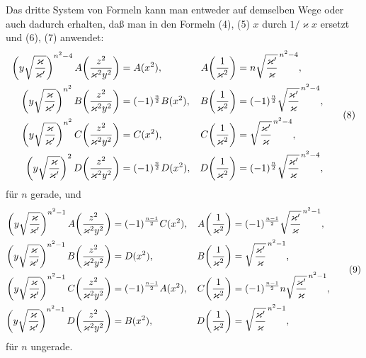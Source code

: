 \documentclass[11pt]{article}
\begin{document}
Das dritte System von Formeln kann man entweder auf demselben Wege oder auch dadurch
erhalten, daß man in den Formeln (4), (5) $x$ durch $1/\varkappa x$ ersetzt und (6), (7)
anwendet:
\begin{equation}
\begin{aligned}
\left(y\sqrt{\varkappa\over\varkappa'}\right)^{n^2-4}
 A\!\left({z^2\over\varkappa^2y^2}\right)&=A(x^2),
& A\!\left({1\over\varkappa^2}\right)&=n\sqrt{\varkappa'\over\varkappa}^{\,n^2-4},\\
\left(y\sqrt{\varkappa\over\varkappa'}\right)^{n^2}
 B\!\left({z^2\over\varkappa^2y^2}\right)&=(-1)^{\frac n2}B(x^2),
& B\!\left({1\over\varkappa^2}\right)&=(-1)^{\frac n2}\sqrt{\varkappa'\over\varkappa}^{\,n^2-4},\\
\left(y\sqrt{\varkappa\over\varkappa'}\right)^{n^2}
 C\!\left({z^2\over\varkappa^2y^2}\right)&=C(x^2),
& C\!\left({1\over\varkappa^2}\right)&=\sqrt{\varkappa'\over\varkappa}^{\,n^2-4},\\
\left(y\sqrt{\varkappa\over\varkappa'}\right)^2
 D\!\left({z^2\over\varkappa^2y^2}\right)&=(-1)^{\frac n2}D(x^2),
& D\!\left({1\over\varkappa^2}\right)&=(-1)^{\frac n2}\sqrt{\varkappa'\over\varkappa}^{\,n^2-4},
\end{aligned}
\tag{8}
\end{equation}
für $n$ gerade, und
\begin{equation}
\begin{aligned}
\left(y\sqrt{\varkappa\over\varkappa'}\right)^{n^2-1}
 A\!\left({z^2\over\varkappa^2y^2}\right)&=(-1)^{\frac{n-1}{2}}C(x^2),
& A\!\left({1\over\varkappa^2}\right)&=(-1)^{\frac{n-1}{2}}\sqrt{\varkappa'\over\varkappa}^{\,n^2-1},\\
\left(y\sqrt{\varkappa\over\varkappa'}\right)^{n^2-1}
 B\!\left({z^2\over\varkappa^2y^2}\right)&=D(x^2),
& B\!\left({1\over\varkappa^2}\right)&=\sqrt{\varkappa'\over\varkappa}^{\,n^2-1},\\
\left(y\sqrt{\varkappa\over\varkappa'}\right)^{n^2-1}
 C\!\left({z^2\over\varkappa^2y^2}\right)&=(-1)^{\frac{n-1}{2}}A(x^2),
& C\!\left({1\over\varkappa^2}\right)&=(-1)^{\frac{n-1}{2}}n\sqrt{\varkappa'\over\varkappa}^{\,n^2-1},\\
\left(y\sqrt{\varkappa\over\varkappa'}\right)^{n^2-1}
 D\!\left({z^2\over\varkappa^2y^2}\right)&=B(x^2),
& D\!\left({1\over\varkappa^2}\right)&=\sqrt{\varkappa'\over\varkappa}^{\,n^2-1},
\end{aligned}
\tag{9}
\end{equation}
für $n$ ungerade.
\end{document}
